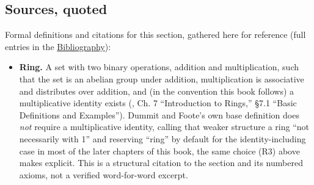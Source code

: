 \subsection{Sources, quoted}\label{sec:09-rings:01-definition:2}

Formal definitions and citations for this section, gathered here for reference (full entries in the \hyperref[sec:root:bibliography:1]{Bibliography}):

\begin{itemize}
\tightlist
\item
  \textbf{Ring.} A set with two binary operations, addition and multiplication, such that the set is an abelian group under addition, multiplication is associative and distributes over addition, and (in the convention this book follows) a multiplicative identity exists (\cite{DummitFoote2003}, Ch. 7 ``Introduction to Rings,'' §7.1 ``Basic Definitions and Examples''). Dummit and Foote's own base definition does \emph{not} require a multiplicative identity, calling that weaker structure a ring ``not necessarily with 1'' and reserving ``ring'' by default for the identity-including case in most of the later chapters of this book, the same choice (R3) above makes explicit. This is a structural citation to the section and its numbered axioms, not a verified word-for-word excerpt.
\end{itemize}
